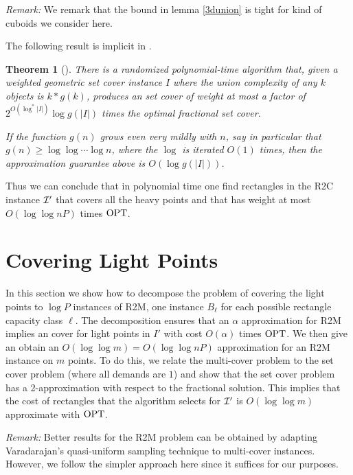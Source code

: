 \documentclass[11pt]{article}
\newtheorem{thm}{Theorem}
\def \OPT  {\mbox{\rm OPT}}
\begin{document}
\noindent
{\em Remark:} We remark that the bound in lemma \ref{3dunion} is tight for kind of cuboids we consider here.

The following result  is implicit in \cite{Varadarajan10}.
\begin{thm} [\cite{Varadarajan10}]
There is a randomized polynomial-time algorithm that,
given a weighted geometric set cover instance $I$
where the union complexity of any $k$ objects is $k* g(k)$,
produces an set cover of weight at most a factor of $2^{O(\log^* |I|)} \log g(|I|)$ times the 
optimal fractional set cover.

If the function $g(n)$ grows even very mildly with $n$, say in particular that $g(n) \geq \log \log \cdots \log n$, where the $\log$ is iterated $O(1)$ times, then the approximation guarantee above is $O(\log g(|I|))$.
\end{thm}


Thus we can conclude that in polynomial time one find rectangles
in the R2C instance $\cal I'$ that 
covers all the heavy points and that has weight at most 
$O(\log \log nP )$ times $\OPT$.





\section{Covering Light Points}
\label{sec:light}

In this section 
we show how to decompose the problem of covering the light 
points to $\log P$ instances of R2M, one instance $B_\ell$ for 
each possible rectangle capacity class $\ell$. The decomposition ensures that an $\alpha$ approximation for R2M implies an cover for light points in $I'$ with cost 
$O(\alpha)$ times $\OPT$.
We then give an obtain an $O(\log \log m) = O(\log \log nP)$ approximation for an R2M instance on $m$ points. 
To do this, we relate the multi-cover 
problem to the set cover problem (where all demands are $1$) and show that the set cover problem has
a 2-approximation with respect to the fractional solution. 
This implies that the cost of rectangles that the algorithm selects for $\cal I'$ is $O(\log \log m)$
approximate with $\OPT$.

\noindent
{\em Remark:} Better results for the R2M problem can be obtained by adapting Varadarajan's quasi-uniform
sampling technique to multi-cover instances. However, we follow the simpler approach here since it suffices for our purposes.

\medskip
\end{document}
